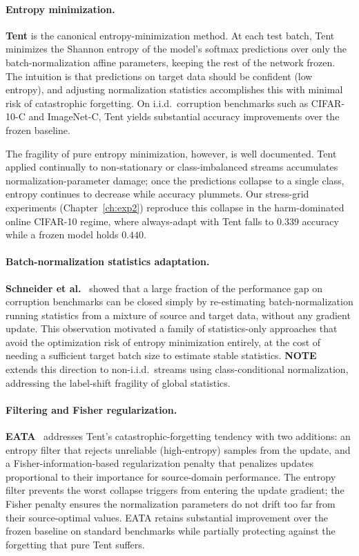 \paragraph{Entropy minimization.}
\textbf{Tent} \cite{wang2021tent} is the canonical entropy-minimization method.
At each test batch, Tent minimizes the Shannon entropy of the model's softmax
predictions over only the batch-normalization affine parameters, keeping the
rest of the network frozen.
The intuition is that predictions on target data should be confident
(low entropy), and adjusting normalization statistics accomplishes this with
minimal risk of catastrophic forgetting.
On i.i.d.\ corruption benchmarks such as CIFAR-10-C
\cite{hendrycks2019benchmarking} and ImageNet-C, Tent yields substantial
accuracy improvements over the frozen baseline.

The fragility of pure entropy minimization, however, is well documented.
Tent applied continually to non-stationary or class-imbalanced streams
accumulates normalization-parameter damage; once the predictions collapse to
a single class, entropy continues to decrease while accuracy plummets.
Our stress-grid experiments (Chapter~\ref{ch:exp2}) reproduce this collapse
in the harm-dominated online CIFAR-10 regime, where always-adapt with Tent
falls to $0.339$ accuracy while a frozen model holds $0.440$.

\paragraph{Batch-normalization statistics adaptation.}
\textbf{Schneider et al.}~\cite{schneider2020bn} showed that a large fraction
of the performance gap on corruption benchmarks can be closed simply by
re-estimating batch-normalization running statistics from a mixture of source
and target data, without any gradient update.
This observation motivated a family of statistics-only approaches that avoid
the optimization risk of entropy minimization entirely, at the cost of needing
a sufficient target batch size to estimate stable statistics.
\textbf{NOTE}~\cite{gong2022note} extends this direction to non-i.i.d.\ streams
using class-conditional normalization, addressing the label-shift fragility of
global statistics.

\paragraph{Filtering and Fisher regularization.}
\textbf{EATA}~\cite{niu2022eata} addresses Tent's catastrophic-forgetting
tendency with two additions: an entropy filter that rejects unreliable
(high-entropy) samples from the update, and a Fisher-information-based
regularization penalty that penalizes updates proportional to their importance
for source-domain performance.
The entropy filter prevents the worst collapse triggers from entering the
update gradient; the Fisher penalty ensures the normalization parameters do
not drift too far from their source-optimal values.
EATA retains substantial improvement over the frozen baseline on standard
benchmarks while partially protecting against the forgetting that pure Tent
suffers.

